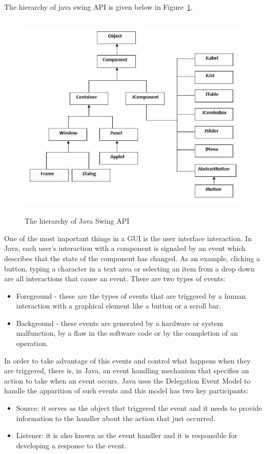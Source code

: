 \documentclass[12pt,a4paper]{report}
\begin{document}
The hierarchy of java swing API is given below in Figure~\ref{fig:swing}.
\begin{figure}[!ht]
	\centering
	\includegraphics[width=12cm,height=10cm]{pics/swing.jpg}
	\caption{The hierarchy of Java Swing API}
	\label{fig:swing}
\end{figure}
\newpage
One of the most important things in a GUI is the user interface interaction. In Java, each user's interaction with a component is signaled by an event which describes that the state of the component has changed. As an example, clicking a button, typing a character in a text area or selecting an item from a drop down are all interactions that cause an event. There are two types of events:
\begin{itemize}
	\item Foreground - these are the types of events that are triggered by a human interaction with a graphical element like a button or a scroll bar. 
	\item Background - these events are generated by a hardware or system malfunction, by a flaw in the software code or by the completion of an operation.
\end{itemize}
In order to take advantage of this events and control what happens when they are triggered, there is, in Java, an event handling mechanism that specifies an action to take when an event occurs. Java uses the Delegation Event Model to handle the apparition of such events and this model has two key participants:
\begin{itemize}
	\item Source: it serves as the object that triggered the event and it needs to provide information to the handler about the action that just occurred.  
	\item Listener: it is also known as the event handler and it is responsible for developing a response to the event. 
\end{itemize}
\end{document}
